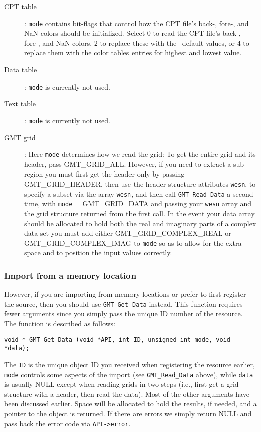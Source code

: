 \documentclass[11pt]{report}
\begin{document}
\begin{description}
\item [CPT table]:  \texttt{mode} contains bit-flags that control how the CPT file's back-, fore-, and NaN-colors
should be initialized.  Select 0 to read the CPT file's back-, fore-, and NaN-colors, 2
to replace these with the \GMT\ default values, or 4 to replace them with the color tables
entries for highest and lowest value.
\item [Data table]:  \texttt{mode} is currently not used.
\item [Text table]:  \texttt{mode} is currently not used.
\item [GMT grid]:  Here \texttt{mode} determines how we read the grid:
To get the entire grid and its header, pass GMT\_GRID\_ALL.  However, if you
need to extract a sub-region you must first get the header only by passing
GMT\_GRID\_HEADER, then use the header structure attributes \texttt{wesn},
to specify a subset via the array \texttt{wesn}, and then call
\texttt{GMT\_Read\_Data} a second time, with \texttt{mode} = GMT\_GRID\_DATA and passing your \texttt{wesn} array
and the grid structure returned from the first call.
In the event your data array should be allocated to hold both the real and imaginary parts of a
complex data set you must add either GMT\_GRID\_COMPLEX\_REAL or GMT\_GRID\_COMPLEX\_IMAG to \texttt{mode}
so as to allow for the extra space and to position the input values correctly.
\end{description}

\subsubsection{Import from a memory location}

However, if you are importing from memory locations or prefer to first register the source, then you
should use \texttt{GMT\_Get\_Data} instead.  This function requires fewer arguments since you simply
pass the unique ID number of the resource.  The function is described as follows:


\begin{verbatim}
void * GMT_Get_Data (void *API, int ID, unsigned int mode, void *data);
\end{verbatim}
The \texttt{ID} is the unique object ID you received when registering the resource earlier,
\texttt{mode} controls some aspects of the import (see \texttt{GMT\_Read\_Data} above),
while \texttt{data} is usually NULL except when reading grids in two steps
(i.e., first get a grid structure with a header, then read the data).
Most of the other arguments have been discussed earlier.  
Space will be allocated to hold the results, if needed, and a pointer to the object is returned.
If there are errors we simply return NULL and pass back the error code via \texttt{API->error}.
\end{document}
